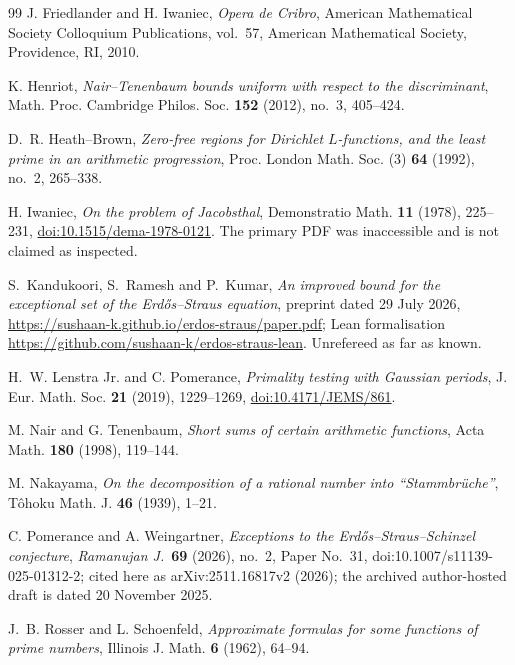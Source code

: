 \documentclass[10pt,reqno]{amsart}
\theoremstyle{definition}
\newcommand{\1}{\mathbf 1}
\begin{document}
\begin{thebibliography}{99}
J. Friedlander and H. Iwaniec,
\emph{Opera de Cribro},
American Mathematical Society Colloquium Publications, vol.~57,
American Mathematical Society, Providence, RI, 2010.

K. Henriot,
\emph{Nair--Tenenbaum bounds uniform with respect to the discriminant},
Math. Proc. Cambridge Philos. Soc. \textbf{152} (2012), no.~3, 405--424.

D.~R. Heath--Brown,
\emph{Zero-free regions for Dirichlet $L$-functions, and the least prime in
an arithmetic progression},
Proc. London Math. Soc. (3) \textbf{64} (1992), no.~2, 265--338.

H. Iwaniec,
\emph{On the problem of Jacobsthal},
Demonstratio Math. \textbf{11} (1978), 225--231,
\href{https://doi.org/10.1515/dema-1978-0121}{doi:10.1515/dema-1978-0121}.
The primary PDF was inaccessible and is not claimed as inspected.

S.~Kandukoori, S.~Ramesh and P.~Kumar,
\emph{An improved bound for the exceptional set of the Erd\H{o}s--Straus
equation}, preprint dated 29 July 2026,
\url{https://sushaan-k.github.io/erdos-straus/paper.pdf};
Lean formalisation \url{https://github.com/sushaan-k/erdos-straus-lean}.
Unrefereed as far as known.

H.~W. Lenstra Jr. and C. Pomerance,
\emph{Primality testing with Gaussian periods},
J. Eur. Math. Soc. \textbf{21} (2019), 1229--1269,
\href{https://doi.org/10.4171/JEMS/861}{doi:10.4171/JEMS/861}.

M. Nair and G. Tenenbaum,
\emph{Short sums of certain arithmetic functions},
Acta Math. \textbf{180} (1998), 119--144.

M. Nakayama,
\emph{On the decomposition of a rational number into ``Stammbr\"uche''},
T\^ohoku Math. J. \textbf{46} (1939), 1--21.

C. Pomerance and A. Weingartner,
\emph{Exceptions to the Erd\H{o}s--Straus--Schinzel conjecture},
\emph{Ramanujan J.}\ \textbf{69} (2026), no.~2, Paper No.~31,
doi:10.1007/s11139-025-01312-2; cited here as
arXiv:2511.16817v2 (2026); the archived author-hosted draft is dated
20 November 2025.

J.~B. Rosser and L. Schoenfeld,
\emph{Approximate formulas for some functions of prime numbers},
Illinois J. Math. \textbf{6} (1962), 64--94.


\end{thebibliography}
\end{document}
